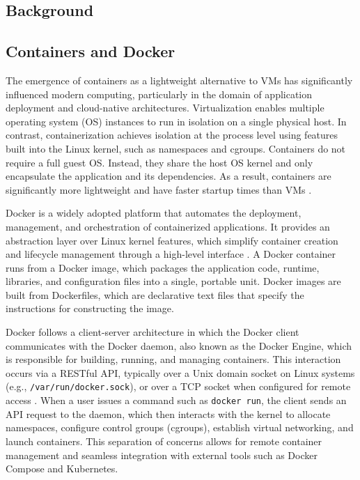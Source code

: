 \documentclass[12pt]{report}
\begin{document}
\begin{doublespace}
\chapter{Background}



\section{Containers and Docker}

The emergence of containers as a lightweight alternative to VMs has significantly influenced modern computing, particularly in the domain of application deployment and cloud-native architectures. Virtualization enables multiple operating system (OS) instances to run in isolation on a single physical host. In contrast, containerization achieves isolation at the process level using features built into the Linux kernel, such as namespaces and cgroups. Containers do not require a full guest OS. Instead, they share the host OS kernel and only encapsulate the application and its dependencies. As a result, containers are significantly more lightweight and have faster startup times than VMs \cite{sharma2016containers}.

Docker is a widely adopted platform that automates the deployment, management, and orchestration of containerized applications. It provides an abstraction layer over Linux kernel features, which simplify container creation and lifecycle management through a high-level interface \cite{ostrowski2024containerd}. A Docker container runs from a Docker image, which packages the application code, runtime, libraries, and configuration files into a single, portable unit. Docker images are built from Dockerfiles, which are declarative text files that specify the instructions for constructing the image.

Docker follows a client-server architecture in which the Docker client communicates with the Docker daemon, also known as the Docker Engine, which is responsible for building, running, and managing containers. This interaction occurs via a RESTful API, typically over a Unix domain socket on Linux systems (e.g., \texttt{/var/run/docker.sock}), or over a TCP socket when configured for remote access \cite{mrdevsecops_dockerarchitecture}. When a user issues a command such as \texttt{docker run}, the client sends an API request to the daemon, which then interacts with the kernel to allocate namespaces, configure control groups (cgroups), establish virtual networking, and launch containers. This separation of concerns allows for remote container management and seamless integration with external tools such as Docker Compose and Kubernetes.


\end{doublespace}
\end{document}

